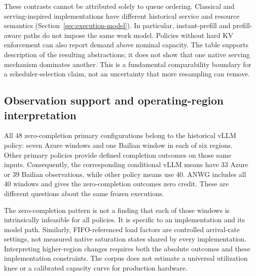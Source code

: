 These contrasts cannot be attributed solely to queue ordering. Classical
and serving-inspired implementations have different historical service
and resource semantics (Section~\ref{sec:execution-model}). In particular,
instant-prefill and prefill-aware paths do not impose the same work model.
Policies without hard KV enforcement can also report demand above nominal
capacity. The table supports description of the resulting abstractions;
it does not show that one native serving mechanism dominates another.
This is a fundamental comparability boundary for a scheduler-selection
claim, not an uncertainty that more resampling can remove.

\subsection{Observation support and operating-region interpretation}
All 48 zero-completion primary configurations belong to the historical
vLLM policy: seven Azure windows and one Bailian window in each of six
regions. Other primary policies provide defined completion outcomes on
those same inputs. Consequently, the corresponding conditional vLLM means
have 33 Azure or 39 Bailian observations, while other policy means use 40.
ANWG includes all 40 windows and gives the zero-completion outcomes zero
credit. These are different questions about the same frozen executions.

The zero-completion pattern is not a finding that each of those windows
is intrinsically infeasible for all policies. It is specific to an
implementation and its model path. Similarly, FIFO-referenced load factors
are controlled arrival-rate settings, not measured native saturation
states shared by every implementation. Interpreting higher-region changes
requires both the absolute outcomes and these implementation constraints.
The corpus does not estimate a universal utilization knee or a calibrated
capacity curve for production hardware.

